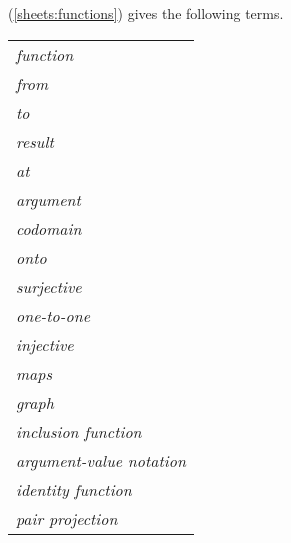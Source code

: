 (\ref{sheets:functions})
gives the following terms.

{ \tiny
\begin{tabular}{l}

\textit{function}
\\

\textit{from}
\\

\textit{to}
\\

\textit{result}
\\

\textit{at}
\\

\textit{argument}
\\

\textit{codomain}
\\

\textit{onto}
\\

\textit{surjective}
\\

\textit{one-to-one}
\\

\textit{injective}
\\

\textit{maps}
\\

\textit{graph}
\\

\textit{inclusion function}
\\

\textit{argument-value notation}
\\

\textit{identity function}
\\

\textit{pair projection}
\\

\end{tabular}
}


\clearpage{}

\newpage
\label{function_restrictions_and_extensions}
\label{sheets:function_restrictions_and_extensions}
\hypertarget{function_restrictions_and_extensions}{}


\clearpage


